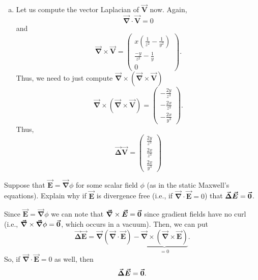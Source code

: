 \documentclass[12pt]{article} %
\newcommand{\grad}{\boldsymbol{\vec{\nabla}}}
\newcommand{\vecfieldV}{\boldsymbol{\vec{V}}}
\newcommand{\veclaplace}{\boldsymbol{\vec{\Delta}}}
\newcommand{\vecfieldE}{\boldsymbol{\vec{E}}}
\begin{document}
\begin{solution}
\begin{enumerate}[(a)]
    \item Let us compute the vector Laplacian of $\vecfieldV$ now. Again,
    \[
        \grad \cdot \vecfieldV = 0
    \]
    and
    \[
        \grad \times \vecfieldV = \begin{pmatrix} x\left(\frac{1}{z^2}-\frac{1}{y^2} \right) \\ \frac{-y}{z^2}-\frac{1}{y} \\ 0 \end{pmatrix}.
    \]
    Thus, we need to just compute $\grad \times (\grad \times \vecfieldV)$
    \[
        \grad \times (\grad \times \vecfieldV) = \begin{pmatrix} -\frac{2y}{z^3} \\ -\frac{2x}{z^3} \\ -\frac{2x}{y^3} \end{pmatrix}.
    \]
    Thus,
    \[
    \veclaplace \vecfieldV = \begin{pmatrix} \frac{2y}{z^3} \\ \frac{2x}{z^3} \\ \frac{2x}{y^3} \end{pmatrix}
    \]
    
\end{enumerate}
\end{solution}

\newpage
\begin{problem}
    Suppose that $\vecfieldE = \grad \phi$ for some scalar field $\phi$ (as in the static Maxwell's equations).  Explain why if $\vecfieldE$ is divergence free (i.e., if $\grad \cdot \vecfieldE=0$) that $\veclaplace \vecfieldE = \zerovec$.
\end{problem}
\begin{solution}
    Since $\vecfieldE=\grad \phi$ we can note that $\grad \times \vecfieldE = \zerovec$ since gradient fields have no curl (i.e., $\grad \times \grad \phi = \zerovec$, which occurs in a vacuum). Then, we can put
    \[
    \veclaplace \vecfieldE = \grad (\grad \cdot \vecfieldE) - \underbrace{\grad \times (\grad \times \vecfieldE)}_{=0}.
    \]
    So, if $\grad \cdot \vecfieldE = 0$ as well, then 
    \[
    \veclaplace \vecfieldE = \zerovec.
    \]
\end{solution}
\end{document}
